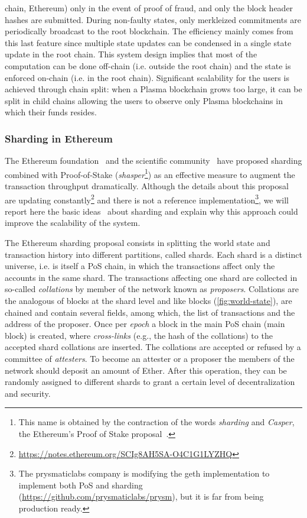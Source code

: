 chain, Ethereum) only in the event of proof of fraud, and only the block header
hashes are submitted. During non-faulty states, only merkleized commitments are
periodically broadcast to the root blockchain. The efficiency mainly comes from
this last feature since multiple state updates can be condensed in a single
state update in the root chain. This system design implies that most of the
computation can be done off-chain (i.e. outside the root chain) and the state is
enforced on-chain (i.e. in the root chain). Significant scalability for the
users is achieved through chain split: when a Plasma blockchain grows too large,
it can be split in child chains allowing the users to observe only Plasma
blockchains in which their funds resides.

\subsubsection{Sharding in Ethereum}
The Ethereum foundation~\cite{bib:mauve, bib:sharding-faq} and the scientific
community~\cite{bib:scaling-croman} have proposed sharding combined with
Proof-of-Stake (\emph{shasper}\footnote{This name is obtained by the
contraction of the words \emph{sharding} and \emph{Casper}, the Ethereum's
Proof of Stake proposal~\cite{bib:cbc-casper}.}) as an effective measure to
augment the transaction throughput dramatically.
Although the details about this proposal are updating
constantly\footnote{\url{https://notes.ethereum.org/SCIg8AH5SA-O4C1G1LYZHQ}}
and there is not a reference implementation\footnote{The prysmaticlabs company
is modifying the geth implementation to implement both PoS and sharding
(\url{https://github.com/prysmaticlabs/prysm}), but it is far from being
production ready.}, we will report here the basic
ideas~\cite{bib:mauve,bib:sharding-faq} about sharding and explain why this
approach could improve the scalability of the system.

The Ethereum sharding proposal consists in splitting the world state and
transaction history into different partitions, called shards. Each shard is a
distinct universe, i.e. is itself a PoS chain, in which the transactions affect
only the accounts in the same shard. The transactions affecting one shard are
collected in so-called \emph{collations} by member of the network known as
\emph{proposers}. Collations are the analogous of blocks at the shard level and
like blocks (\autoref{fig:world-state}), are chained and contain several
fields, among which, the list of transactions and the address of the proposer.
Once per \emph{epoch} a block in the main PoS chain (main block) is created,
where \emph{cross-links} (e.g., the hash of the collations) to the accepted
shard collations are inserted. The collations are accepted or refused by a
committee of \emph{attesters}. To become an attester or a proposer the members
of the network should deposit an amount of Ether.
After this operation, they can be randomly assigned to different shards to
grant a certain level of decentralization and security.

